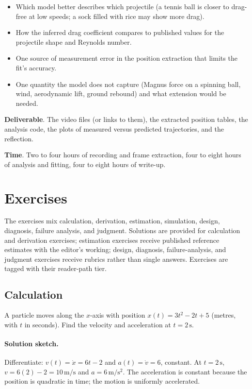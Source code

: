 \begin{project}
\begin{itemize}[leftmargin=*]
  \item Which model better describes which projectile (a tennis
    ball is closer to drag-free at low speeds; a sock filled with
    rice may show more drag).
  \item How the inferred drag coefficient compares to published
    values for the projectile shape and Reynolds number.
  \item One source of measurement error in the position extraction
    that limits the fit's accuracy.
  \item One quantity the model does not capture (Magnus force on a
    spinning ball, wind, aerodynamic lift, ground rebound) and what
    extension would be needed.
\end{itemize}

\textbf{Deliverable}. The video files (or links to them), the
extracted position tables, the analysis code, the plots of measured
versus predicted trajectories, and the reflection.

\textbf{Time}. Two to four hours of recording and frame extraction,
four to eight hours of analysis and fitting, four to eight hours of
write-up.
\end{project}

\section{Exercises}

The exercises mix calculation, derivation, estimation, simulation,
design, diagnosis, failure analysis, and judgment. Solutions are
provided for calculation and derivation exercises; estimation
exercises receive published reference estimates with the editor's
working; design, diagnosis, failure-analysis, and judgment exercises
receive rubrics rather than single answers. Exercises are tagged
with their reader-path tier.

\subsection*{Calculation}

\begin{exercise}
A particle moves along the $x$-axis with position $x(t) = 3t^2 - 2t
+ 5$ (metres, with $t$ in seconds). Find the velocity and
acceleration at $t = 2\,\si{\second}$.
\paragraph{Solution sketch.} Differentiate: $v(t)=\dot{x}=6t-2$ and
$a(t)=\dot{v}=6$, constant. At $t=2\,\si{\second}$, $v=6(2)-2=
10\,\si{\meter\per\second}$ and $a=6\,\si{\meter\per\second\squared}$.
The acceleration is constant because the position is quadratic in
time; the motion is uniformly accelerated.
\end{exercise}

